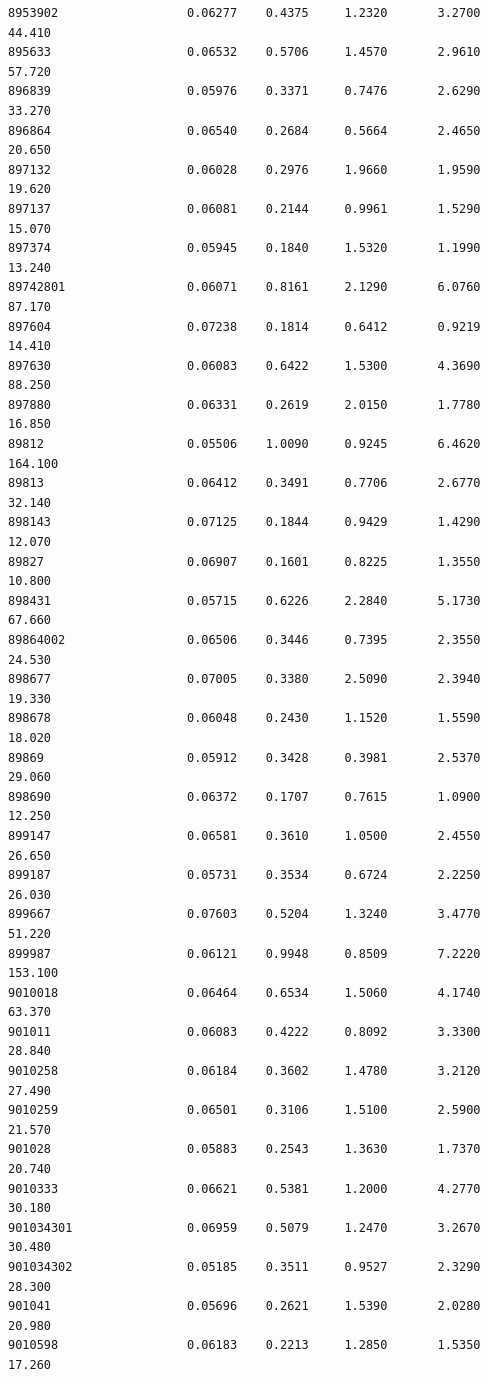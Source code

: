 \documentclass[
  letterpaper,
  DIV=11,
  numbers=noendperiod]{scrartcl}
\begin{document}
\begin{verbatim}
8953902                  0.06277    0.4375     1.2320       3.2700  44.410
895633                   0.06532    0.5706     1.4570       2.9610  57.720
896839                   0.05976    0.3371     0.7476       2.6290  33.270
896864                   0.06540    0.2684     0.5664       2.4650  20.650
897132                   0.06028    0.2976     1.9660       1.9590  19.620
897137                   0.06081    0.2144     0.9961       1.5290  15.070
897374                   0.05945    0.1840     1.5320       1.1990  13.240
89742801                 0.06071    0.8161     2.1290       6.0760  87.170
897604                   0.07238    0.1814     0.6412       0.9219  14.410
897630                   0.06083    0.6422     1.5300       4.3690  88.250
897880                   0.06331    0.2619     2.0150       1.7780  16.850
89812                    0.05506    1.0090     0.9245       6.4620 164.100
89813                    0.06412    0.3491     0.7706       2.6770  32.140
898143                   0.07125    0.1844     0.9429       1.4290  12.070
89827                    0.06907    0.1601     0.8225       1.3550  10.800
898431                   0.05715    0.6226     2.2840       5.1730  67.660
89864002                 0.06506    0.3446     0.7395       2.3550  24.530
898677                   0.07005    0.3380     2.5090       2.3940  19.330
898678                   0.06048    0.2430     1.1520       1.5590  18.020
89869                    0.05912    0.3428     0.3981       2.5370  29.060
898690                   0.06372    0.1707     0.7615       1.0900  12.250
899147                   0.06581    0.3610     1.0500       2.4550  26.650
899187                   0.05731    0.3534     0.6724       2.2250  26.030
899667                   0.07603    0.5204     1.3240       3.4770  51.220
899987                   0.06121    0.9948     0.8509       7.2220 153.100
9010018                  0.06464    0.6534     1.5060       4.1740  63.370
901011                   0.06083    0.4222     0.8092       3.3300  28.840
9010258                  0.06184    0.3602     1.4780       3.2120  27.490
9010259                  0.06501    0.3106     1.5100       2.5900  21.570
901028                   0.05883    0.2543     1.3630       1.7370  20.740
9010333                  0.06621    0.5381     1.2000       4.2770  30.180
901034301                0.06959    0.5079     1.2470       3.2670  30.480
901034302                0.05185    0.3511     0.9527       2.3290  28.300
901041                   0.05696    0.2621     1.5390       2.0280  20.980
9010598                  0.06183    0.2213     1.2850       1.5350  17.260

\end{verbatim}
\end{document}
